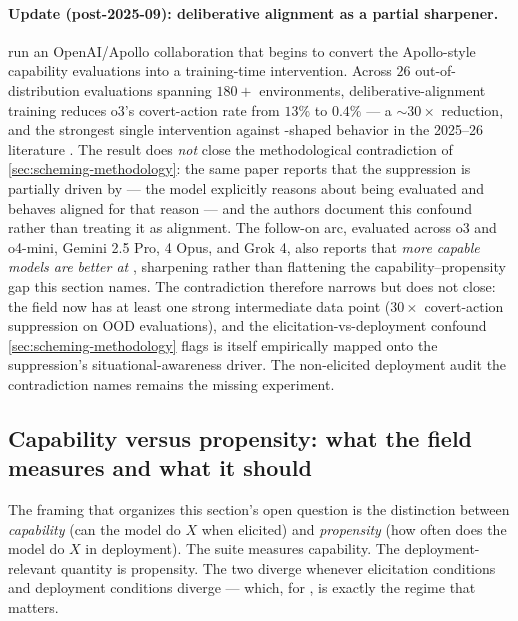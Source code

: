 \paragraph{Update (post-2025-09): deliberative alignment as a partial
sharpener.}  run an
OpenAI/Apollo collaboration that begins to convert the Apollo-style
capability evaluations into a training-time intervention. Across $26$
out-of-distribution evaluations spanning $180+$ environments,
deliberative-alignment training reduces o3's covert-action rate from
$13\%$ to $0.4\%$ --- a $\sim\!30\!\times$ reduction, and the
strongest single intervention against -shaped behavior in the
2025--26 literature \citep{openai2025-deliberative-alignment}. The
result does \emph{not} close the methodological contradiction of
\cref{sec:scheming-methodology}: the same paper reports that the
suppression is partially driven by \emph{} ---
the model explicitly reasons about being evaluated and behaves
aligned for that reason --- and the authors document this confound
rather than treating it as alignment. The follow-on
arc, evaluated across o3 and o4-mini, Gemini 2.5 Pro,
 4 Opus, and Grok 4, also reports that \emph{more capable
models are better at }, sharpening rather than
flattening the capability--propensity gap this section names.
The contradiction therefore narrows but does not close: the field
now has at least one strong intermediate data point
($30\!\times$ covert-action suppression on OOD evaluations), and the
elicitation-vs-deployment confound \cref{sec:scheming-methodology}
flags is itself empirically mapped onto the suppression's
situational-awareness driver. The non-elicited deployment audit the
contradiction names remains the missing experiment.

\subsection{Capability versus propensity: what the field measures and what it should}
\label{sec:scheming-capability-vs-propensity}

The framing that organizes this section's open question is the
distinction between \emph{capability} (can the model do $X$ when
elicited) and \emph{propensity} (how often does the model do $X$ in
deployment). The suite measures capability. The deployment-relevant
quantity is propensity. The two diverge whenever elicitation
conditions and deployment conditions diverge --- which, for ,
is exactly the regime that matters.

